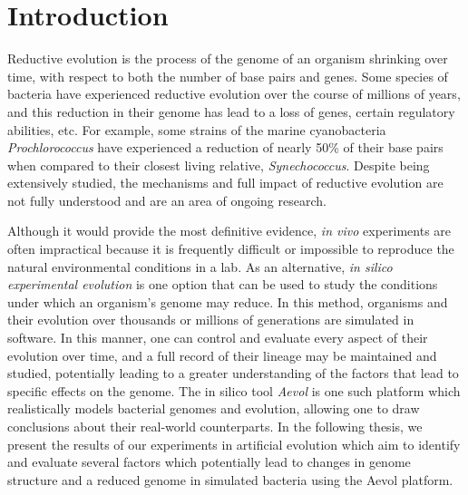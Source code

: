 \chapter{Introduction}\label{ch:intro}
Reductive evolution is the process of the genome of an organism shrinking over time, with respect to both the number of base pairs and genes. Some species of bacteria have experienced reductive evolution over the course of millions of years, and this reduction in their genome has lead to a loss of genes, certain regulatory abilities, etc. For example, some strains of the marine cyanobacteria \textit{Prochlorococcus} have experienced a reduction of nearly 50\% of their base pairs when compared to their closest living relative, \textit{Synechococcus}. Despite being extensively studied, the mechanisms and full impact of reductive evolution are not fully understood and are an area of ongoing research. 

Although it would provide the most definitive evidence, \textit{in vivo} experiments are often impractical because it is frequently difficult or impossible to reproduce the natural environmental conditions in a lab. As an alternative, \textit{in silico experimental evolution} is one option that can be used to study the conditions under which an organism's genome may reduce. In this method, organisms and their evolution over thousands or millions of generations are simulated in software. In this manner, one can control and evaluate every aspect of their evolution over time, and a full record of their lineage may be maintained and studied, potentially leading to a greater understanding of the factors that lead to specific effects on the genome. The in silico tool \textit{Aevol} is one such platform which realistically models bacterial genomes and evolution, allowing one to draw conclusions about their real-world counterparts. In the following thesis, we present the results of our experiments in artificial evolution which aim to identify and evaluate several factors which potentially lead to changes in genome structure and a reduced genome in simulated bacteria using the Aevol platform. 

